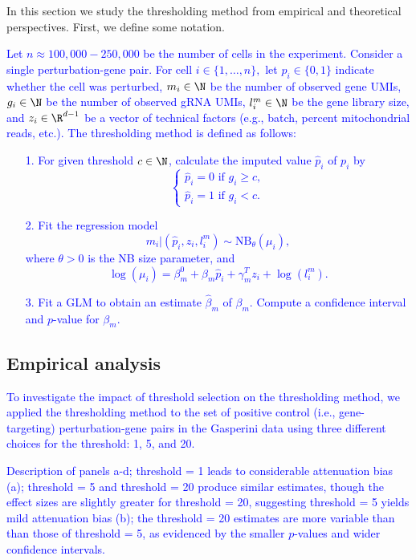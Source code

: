 \documentclass[12pt]{article}
\newcommand{\blue}[1]{\textcolor{blue}{#1}}
\begin{document}
In this section we study the thresholding method from empirical and theoretical perspectives. First, we define some notation.

\blue{Let $n \approx 100,000 - 250,000$ be the number of cells in the experiment. Consider a single perturbation-gene pair. For cell $i \in \{ 1, \dots, n \},$ let $p_i \in \{ 0,1 \}$ indicate whether the cell was perturbed, $m_i \in \N$ be the number of observed gene UMIs, $g_i \in \N$ be the number of observed gRNA UMIs, $l^m_i \in \N$ be the gene library size, and $z_i \in \R^{d-1}$ be a vector of technical factors (e.g., batch, percent mitochondrial reads, etc.). The thresholding method is defined as follows:}
\blue{
\begin{itemize}
\item[1.] For given threshold $c \in \N$, calculate the imputed value $\hat{p}_i$ of $p_i$ by $$\begin{cases} \hat{p}_i = 0 \textrm{ if } g_i \geq c, \\ \hat{p}_i = 1 \textrm{ if } g_i < c. \end{cases}$$
\item[2.] Fit the regression model \cite{Sarkar2021}
$$ m_i | \left(\hat{p}_i, z_i, l^m_i \right) \sim \textrm{NB}_\theta(\mu_i),$$ where $\theta >0$ is the NB size parameter, and $$\log\left(\mu_i\right) = \beta_m^0 + \beta_m \hat{p}_i + \gamma^T_m z_i + \log\left( l_i^m\right).$$
\item[3.] Fit a GLM to obtain an estimate $\hat{\beta}_m$ of $\beta_m$. Compute a confidence interval and $p$-value for $\beta_m$.
\end{itemize}}

\subsection{Empirical analysis}

\blue{To investigate the impact of threshold selection on the thresholding method, we applied the thresholding method to the set of positive control (i.e., gene-targeting) perturbation-gene pairs in the Gasperini data using three different choices for the threshold: 1, 5, and 20.}

\blue{Description of panels a-d; threshold = 1 leads to considerable attenuation bias (a); threshold = 5 and threshold = 20 produce similar estimates, though the effect sizes are slightly greater for threshold = 20, suggesting threshold = 5 yields mild attenuation bias (b); the threshold = 20 estimates are more variable than than those of threshold = 5, as evidenced by the smaller $p$-values and wider confidence intervals.}
\end{document}
